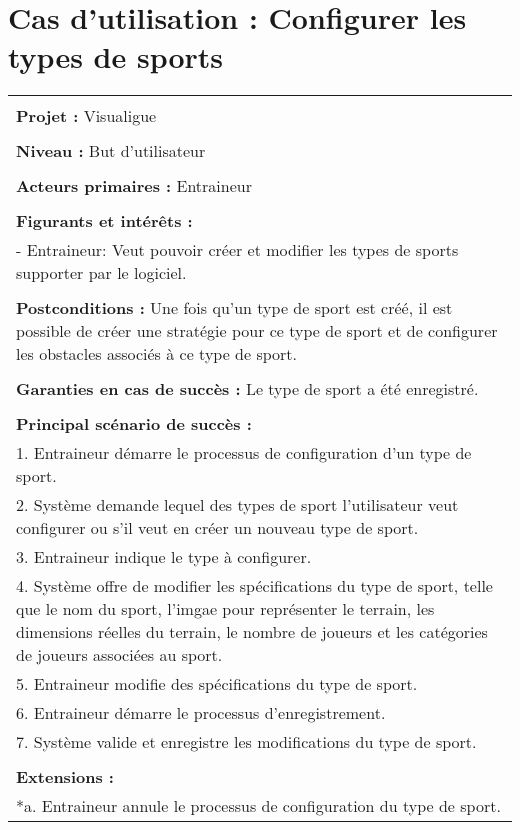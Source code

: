 \section{Cas d'utilisation : Configurer les types de sports}
\begin{longtable}{|p{16cm}|}
	\hline
	\\
	\textbf{Projet :} Visualigue\\
	\\
	\textbf{Niveau :} But d'utilisateur\\
	\\
	\textbf{Acteurs primaires :} Entraineur\\
	\\
	\textbf{Figurants et intérêts :} \\
	- Entraineur: Veut pouvoir créer et modifier les types de sports supporter par le logiciel.\\
	\\
	\textbf{Postconditions :} Une fois qu'un type de sport est créé, il est possible de créer une stratégie pour ce type de sport et de configurer les obstacles associés à ce type de sport.\\
	\\
	\textbf{Garanties en cas de succès :} Le type de sport a été enregistré.\\
	\\
	\textbf{Principal scénario de succès :}\\
	1. Entraineur démarre le processus de configuration d'un  type de sport.\\
	2. Système demande lequel des types de sport l'utilisateur veut configurer ou s'il veut en créer un nouveau type de sport.\\
	3. Entraineur indique le type à configurer.\\
	4. Système offre de modifier les spécifications du type de sport, telle que le nom du sport, l'imgae pour représenter le terrain, les dimensions réelles du terrain, le nombre de joueurs et les catégories de joueurs associées au sport.\\
	5. Entraineur modifie des spécifications du type de sport.\\
	6. Entraineur démarre le processus d'enregistrement.\\
	7. Système valide et enregistre les modifications du type de sport.\\
	\\
	\textbf{Extensions :}\\
	*a. Entraineur annule le processus de configuration du type de sport.\\

\end{longtable}
